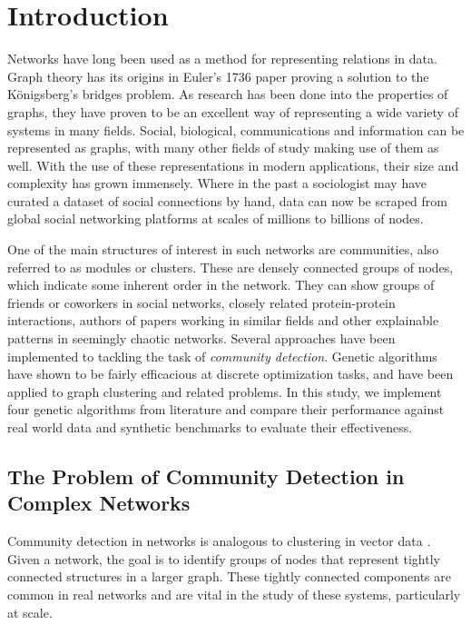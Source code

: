 \chapter{Introduction}
\label{ch:intro:introduction}
Networks have long been used as a method for representing relations in data. Graph theory has its origins in Euler's 1736 paper proving a solution to the K\"{o}nigsberg's bridges problem. As research has been done into the properties of graphs, they have proven to be an excellent way of representing a wide variety of systems in many fields. Social, biological, communications and information can be represented as graphs, with many other fields of study making use of them as well. With the use of these representations in modern applications, their size and complexity has grown immensely. Where in the past a sociologist may have curated a dataset of social connections by hand, data can now be scraped from global social networking platforms at scales of millions to billions of nodes. 

One of the main structures of interest in such networks are communities, also referred to as modules or clusters. These are densely connected groups of nodes, which indicate some inherent order in the network. They can show groups of friends or coworkers in social networks, closely related protein-protein interactions, authors of papers working in similar fields and other explainable patterns in seemingly chaotic networks. Several approaches have been implemented to tackling the task of \textit{community detection}. Genetic algorithms have shown to be fairly efficacious at discrete optimization tasks, and have been applied to graph clustering and related problems. In this study, we implement four genetic algorithms from literature and compare their performance against real world data and synthetic benchmarks to evaluate their effectiveness.


\pagebreak

\section{The Problem of Community Detection in Complex Networks}
Community detection in networks is analogous to clustering in vector data \cite{Peel2016}. Given a network, the goal is to identify groups of nodes that represent tightly connected structures in a larger graph. These tightly connected components are common in real networks and are vital in the study of these systems, particularly at scale.

